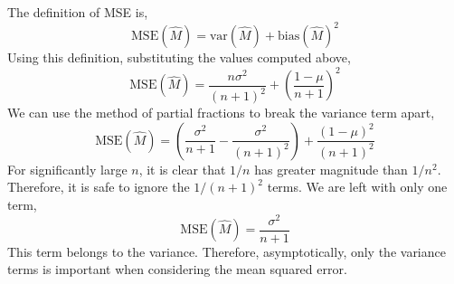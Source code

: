\documentclass[12pt,twoside]{article}
\begin{document}
\begin{problems}
\begin{problemparts}
\problempart %

The definition of MSE is,
$$ \mathrm{MSE}(\hat{M}) = \mathrm{var}(\hat{M}) + \mathrm{bias}(\hat{M})^2 $$
Using this definition, substituting the values computed above,
$$ \mathrm{MSE}(\hat{M}) = \frac{n \sigma^2}{(n + 1)^2} + \left(\frac{1 - \mu}
{n + 1}\right)^2 $$
We can use the method of partial fractions to break the variance term apart,
$$ \mathrm{MSE}(\hat{M}) = \left(\frac{\sigma^2}{n + 1} - \frac{\sigma^2}{(n
+ 1)^2}\right) + \frac{\left(1 - \mu\right)^2}{(n + 1)^2} $$
For significantly large $n$, it is clear that $1/n$ has greater magnitude than
$1/n^2$. Therefore, it is safe to ignore the $1 / (n + 1)^2$ terms. We are left
with only one term,
$$ \mathrm{MSE}(\hat{M}) = \boxed{\frac{\sigma^2}{n + 1}} $$
This term belongs to the variance. Therefore, asymptotically, only the variance
terms is important when considering the mean squared error.
    
\end{problemparts}

\newpage
\problem  %

\begin{problemparts}

\problempart %


\end{problemparts}
\end{problems}
\end{document}
